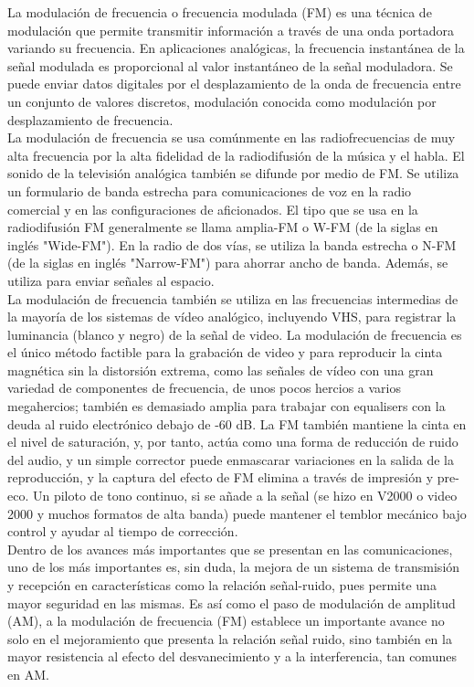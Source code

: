 \documentclass[a4paper]{article}
\begin{document}
La modulación de frecuencia o frecuencia modulada (FM) es una técnica de modulación que permite transmitir información a través de una onda portadora variando su frecuencia.
En aplicaciones analógicas, la frecuencia instantánea de la señal modulada es proporcional al valor instantáneo de la señal moduladora.
Se puede enviar datos digitales por el desplazamiento de la onda de frecuencia entre un conjunto de valores discretos, modulación conocida como modulación por desplazamiento de frecuencia.
\\
La modulación de frecuencia se usa comúnmente en las radiofrecuencias de muy alta frecuencia por la alta fidelidad de la radiodifusión de la música y el habla. El sonido de la televisión analógica también se difunde por medio de FM. Se utiliza un formulario de banda estrecha para comunicaciones de voz en la radio comercial y en las configuraciones de aficionados. El tipo que se usa en la radiodifusión FM generalmente se llama amplia-FM o W-FM (de la siglas en inglés "Wide-FM"). En la radio de dos vías, se utiliza la banda estrecha o N-FM (de la siglas en inglés "Narrow-FM") para ahorrar ancho de banda. Además, se utiliza para enviar señales al espacio.
\\
La modulación de frecuencia también se utiliza en las frecuencias intermedias de la mayoría de los sistemas de vídeo analógico, incluyendo VHS, para registrar la luminancia (blanco y negro) de la señal de video. La modulación de frecuencia es el único método factible para la grabación de video y para reproducir la cinta magnética sin la distorsión extrema, como las señales de vídeo con una gran variedad de componentes de frecuencia, de unos pocos hercios a varios megahercios; también es demasiado amplia para trabajar con equalisers con la deuda al ruido electrónico debajo de -60 dB. La FM también mantiene la cinta en el nivel de saturación, y, por tanto, actúa como una forma de reducción de ruido del audio, y un simple corrector puede enmascarar variaciones en la salida de la reproducción, y la captura del efecto de FM elimina a través de impresión y pre-eco. Un piloto de tono continuo, si se añade a la señal (se hizo en V2000 o video 2000 y muchos formatos de alta banda) puede mantener el temblor mecánico bajo control y ayudar al tiempo de corrección.
\\
Dentro de los avances más importantes que se presentan en las comunicaciones, uno de los más importantes es, sin duda, la mejora de un sistema de transmisión y recepción en características como la relación señal-ruido, pues permite una mayor seguridad en las mismas. Es así como el paso de modulación de amplitud (AM), a la modulación de frecuencia (FM) establece un importante avance no solo en el mejoramiento que presenta la relación señal ruido, sino también en la mayor resistencia al efecto del desvanecimiento y a la interferencia, tan comunes en AM.
\end{document}
